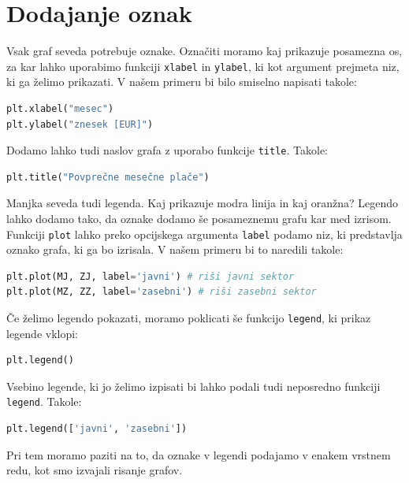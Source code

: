 \section{Dodajanje oznak}
Vsak graf seveda potrebuje oznake. Označiti moramo kaj prikazuje posamezna os, za kar lahko uporabimo funkciji \texttt{xlabel} in \texttt{ylabel}, ki kot argument prejmeta niz, ki ga želimo prikazati. V našem primeru bi bilo smiselno napisati takole:
\begin{lstlisting}[language=Python, showstringspaces=false]
plt.xlabel("mesec")
plt.ylabel("znesek [EUR]")
\end{lstlisting}
Dodamo lahko tudi naslov grafa z uporabo funkcije \texttt{title}. Takole:
\begin{lstlisting}[language=Python, showstringspaces=false]
plt.title("Povprečne mesečne plače")
\end{lstlisting}

Manjka seveda tudi legenda. Kaj prikazuje modra linija in kaj oranžna? Legendo lahko dodamo tako, da oznake dodamo še posameznemu grafu kar med izrisom. Funkciji \texttt{plot} lahko preko opcijskega argumenta \texttt{label} podamo niz, ki predstavlja oznako grafa, ki ga bo izrisala. V našem primeru bi to naredili takole:
\begin{lstlisting}[language=Python, showstringspaces=false]
plt.plot(MJ, ZJ, label='javni') # riši javni sektor
plt.plot(MZ, ZZ, label='zasebni') # riši zasebni sektor
\end{lstlisting}
Če želimo legendo pokazati, moramo poklicati še funkcijo \texttt{legend}, ki prikaz legende vklopi:
\begin{lstlisting}[language=Python, showstringspaces=false]
plt.legend()
\end{lstlisting}
Vsebino legende, ki jo želimo izpisati bi lahko podali tudi neposredno funkciji \texttt{legend}. Takole:
\begin{lstlisting}[language=Python, showstringspaces=false]
plt.legend(['javni', 'zasebni'])
\end{lstlisting}
Pri tem moramo paziti na to, da oznake v legendi podajamo v enakem vrstnem redu, kot smo izvajali risanje grafov.


